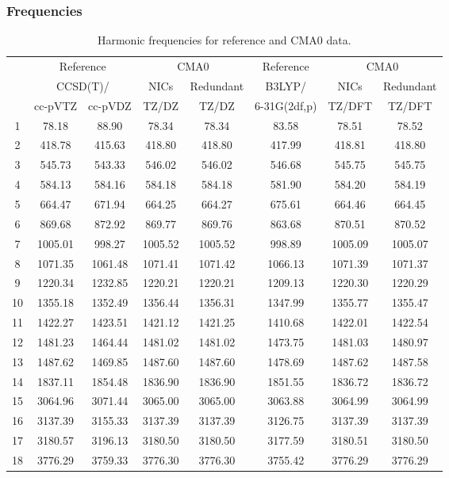 \documentclass[10pt,oneside]{article}
\begin{document}
\begin{table}[h!]
\subsubsection*{Frequencies}
\centering
\caption{Harmonic frequencies for reference and CMA0 data.}
\begin{tabular}{cccccccc}
\toprule
{} & \multicolumn{2}{c}{Reference} & \multicolumn{2}{c}{CMA0} &    Reference & \multicolumn{2}{c}{CMA0} \\
{} & \multicolumn{2}{c}{CCSD(T)/} &    NICs &  Redundant &       B3LYP/ &    NICs & Redundant \\
{} &   cc-pVTZ & cc-pVDZ &   TZ/DZ &      TZ/DZ & 6-31G(2df,p) &  TZ/DFT &    TZ/DFT \\
\midrule
1  &     78.18 &   88.90 &   78.34 &      78.34 &        83.58 &   78.51 &     78.52 \\
2  &    418.78 &  415.63 &  418.80 &     418.80 &       417.99 &  418.81 &    418.80 \\
3  &    545.73 &  543.33 &  546.02 &     546.02 &       546.68 &  545.75 &    545.75 \\
4  &    584.13 &  584.16 &  584.18 &     584.18 &       581.90 &  584.20 &    584.19 \\
5  &    664.47 &  671.94 &  664.25 &     664.27 &       675.61 &  664.46 &    664.45 \\
6  &    869.68 &  872.92 &  869.77 &     869.76 &       863.68 &  870.51 &    870.52 \\
7  &   1005.01 &  998.27 & 1005.52 &    1005.52 &       998.89 & 1005.09 &   1005.07 \\
8  &   1071.35 & 1061.48 & 1071.41 &    1071.42 &      1066.13 & 1071.39 &   1071.37 \\
9  &   1220.34 & 1232.85 & 1220.21 &    1220.21 &      1209.13 & 1220.30 &   1220.29 \\
10 &   1355.18 & 1352.49 & 1356.44 &    1356.31 &      1347.99 & 1355.77 &   1355.47 \\
11 &   1422.27 & 1423.51 & 1421.12 &    1421.25 &      1410.68 & 1422.01 &   1422.54 \\
12 &   1481.23 & 1464.44 & 1481.02 &    1481.02 &      1473.75 & 1481.03 &   1480.97 \\
13 &   1487.62 & 1469.85 & 1487.60 &    1487.60 &      1478.69 & 1487.62 &   1487.58 \\
14 &   1837.11 & 1854.48 & 1836.90 &    1836.90 &      1851.55 & 1836.72 &   1836.72 \\
15 &   3064.96 & 3071.44 & 3065.00 &    3065.00 &      3063.88 & 3064.99 &   3064.99 \\
16 &   3137.39 & 3155.33 & 3137.39 &    3137.39 &      3126.75 & 3137.39 &   3137.39 \\
17 &   3180.57 & 3196.13 & 3180.50 &    3180.50 &      3177.59 & 3180.51 &   3180.50 \\
18 &   3776.29 & 3759.33 & 3776.30 &    3776.30 &      3755.42 & 3776.29 &   3776.29 \\
\bottomrule
\end{tabular}
\end{table}
\end{document}
